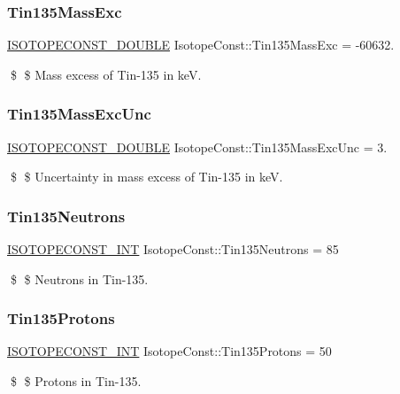 \subsubsection{\texorpdfstring{Tin135\+Mass\+Exc}{Tin135MassExc}}
{\footnotesize\ttfamily \mbox{\hyperlink{group___isotope_const-_macros_ga8f45a7272ce02c0b4c65c44636ed719a}{I\+S\+O\+T\+O\+P\+E\+C\+O\+N\+S\+T\+\_\+\+D\+O\+U\+B\+LE}} Isotope\+Const\+::\+Tin135\+Mass\+Exc = -\/60632.}

\$ \$ Mass excess of Tin-\/135 in keV. \mbox{\label{group___isotope_const-_tin-_sn135_gac9371b0d0423e3fd37832b329c1fc3b5}} 
\subsubsection{\texorpdfstring{Tin135\+Mass\+Exc\+Unc}{Tin135MassExcUnc}}
{\footnotesize\ttfamily \mbox{\hyperlink{group___isotope_const-_macros_ga8f45a7272ce02c0b4c65c44636ed719a}{I\+S\+O\+T\+O\+P\+E\+C\+O\+N\+S\+T\+\_\+\+D\+O\+U\+B\+LE}} Isotope\+Const\+::\+Tin135\+Mass\+Exc\+Unc = 3.}

\$ \$ Uncertainty in mass excess of Tin-\/135 in keV. \mbox{\label{group___isotope_const-_tin-_sn135_ga87053cd1a2e67c27753febc1a8b125a9}} 
\subsubsection{\texorpdfstring{Tin135\+Neutrons}{Tin135Neutrons}}
{\footnotesize\ttfamily \mbox{\hyperlink{group___isotope_const-_macros_ga5f18360b3e99483a35c32d789e62621c}{I\+S\+O\+T\+O\+P\+E\+C\+O\+N\+S\+T\+\_\+\+I\+NT}} Isotope\+Const\+::\+Tin135\+Neutrons = 85}

\$ \$ Neutrons in Tin-\/135. \mbox{\label{group___isotope_const-_tin-_sn135_gad28fd873af7cd135cfcdacec1f900479}} 
\subsubsection{\texorpdfstring{Tin135\+Protons}{Tin135Protons}}
{\footnotesize\ttfamily \mbox{\hyperlink{group___isotope_const-_macros_ga5f18360b3e99483a35c32d789e62621c}{I\+S\+O\+T\+O\+P\+E\+C\+O\+N\+S\+T\+\_\+\+I\+NT}} Isotope\+Const\+::\+Tin135\+Protons = 50}

\$ \$ Protons in Tin-\/135. 